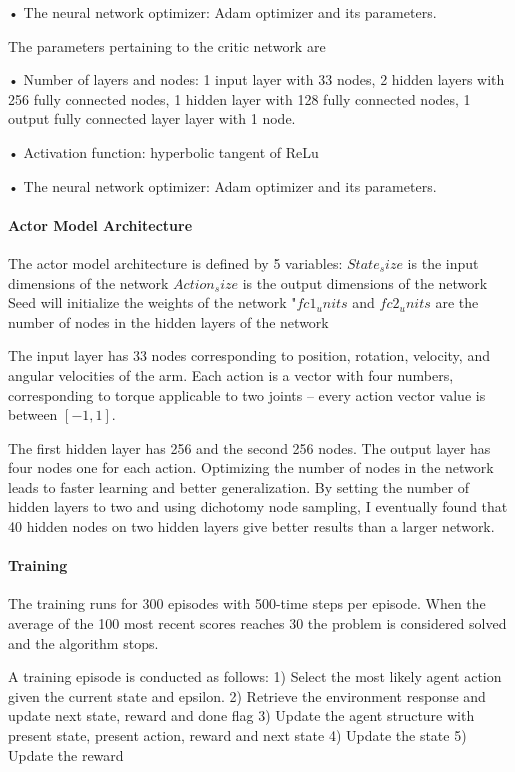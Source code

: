 \documentclass[11pt]{amsart}
\begin{document}
• The neural network optimizer: Adam optimizer and its parameters.

The parameters pertaining to the critic network are

• Number of layers and nodes: 1 input layer with 33 nodes, 2 hidden layers with 256 fully connected nodes,
1 hidden layer with 128 fully connected nodes,
 1 output fully connected layer layer with 1 node.

• Activation function: hyperbolic tangent of ReLu

• The neural network optimizer: Adam optimizer and its parameters.


\paragraph{\textbf{Actor Model Architecture}}
The actor model architecture is defined by 5 variables:
$State_size$ is the input dimensions of the network
$Action_size$ is the output dimensions of the network 
Seed will initialize the weights of the network 
"$fc1_units$ and $fc2_units$ are the number of nodes in the hidden layers of the network


The input layer has 33 nodes corresponding to position, rotation, velocity, and angular velocities of the arm. Each action is a vector with four numbers, corresponding to torque applicable to two joints – every action vector value is between $[-1, 1]$.

The first hidden layer has 256 and the second 256 nodes. The output layer has four nodes one for each action.
Optimizing the number of nodes in the network leads to faster learning and better generalization.
By setting the number of hidden layers to two and using dichotomy node sampling, I eventually found that 40 hidden nodes on two hidden layers give better results than a larger network.

\paragraph{\textbf{Training}}
The training runs for 300 episodes with 500-time steps per episode. When the average of the 100 most recent scores reaches 30 the problem is considered solved and the algorithm stops. 

A training episode is conducted as follows:
1)	Select the  most likely agent action given the current state and epsilon.
2)	Retrieve the environment response and update next state, reward and done flag
3)	Update the agent structure with present state, present action, reward and next state
4)	Update the state
5)	Update the reward
\end{document}
